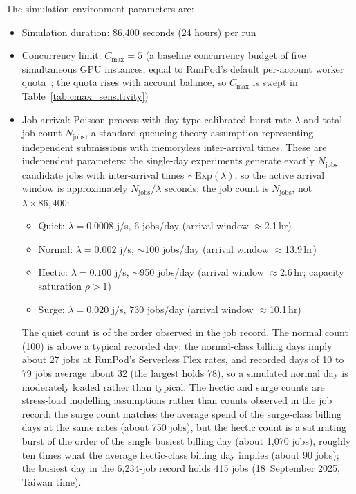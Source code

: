 {The simulation environment parameters are:
\begin{itemize}
  \item Simulation duration: 86,400 seconds (24 hours) per run
  \item Concurrency limit: $C_{\max} = 5$ (a baseline concurrency budget of five simultaneous GPU instances, equal to RunPod's default per-account worker quota~\cite{runpod2026maxworkers}; the quota rises with account balance, so $C_{\max}$ is swept in Table~\ref{tab:cmax_sensitivity})
  \item Job arrival: Poisson process with day-type-calibrated burst rate $\lambda$ and total job count $N_{\text{jobs}}$, a standard queueing-theory assumption representing independent submissions with memoryless inter-arrival times. These are independent parameters: the single-day experiments generate exactly $N_{\text{jobs}}$ candidate jobs with inter-arrival times $\sim\mathrm{Exp}(\lambda)$, so the active arrival window is approximately $N_{\text{jobs}}/\lambda$ seconds; the job count is $N_{\text{jobs}}$, not $\lambda \times 86{,}400$:
  \begin{itemize}[nosep, leftmargin=2em]
    \item Quiet: $\lambda=0.0008$ j/s, 6 jobs/day (arrival window $\approx$2.1\,hr)
    \item Normal: $\lambda=0.002$ j/s, $\sim$100 jobs/day (arrival window $\approx$13.9\,hr)
    \item Hectic: $\lambda=0.100$ j/s, $\sim$950 jobs/day (arrival window $\approx$2.6\,hr; capacity saturation $\rho>1$)
    \item Surge: $\lambda=0.020$ j/s, 730 jobs/day (arrival window $\approx$10.1\,hr)
  \end{itemize}
  The quiet count is of the order observed in the job record. The normal count (100) is above a typical recorded day: the normal-class billing days imply about 27 jobs at RunPod's Serverless Flex rates, and recorded days of 10 to 79 jobs average about 32 (the largest holds 78), so a simulated normal day is moderately loaded rather than typical. The hectic and surge counts are stress-load modelling assumptions rather than counts observed in the job record: the surge count matches the average spend of the surge-class billing days at the same rates (about 750 jobs), but the hectic count is a saturating burst of the order of the single busiest billing day (about 1,070 jobs), roughly ten times what the average hectic-class billing day implies (about 90 jobs); the busiest day in the 6,234-job record holds 415 jobs (18~September 2025, Taiwan time).

\end{itemize}}
